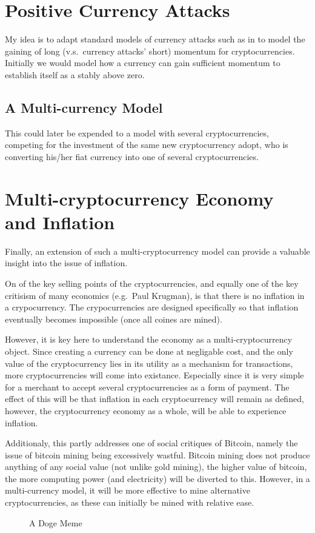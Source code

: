 \begin{refsection}
\section{Positive Currency Attacks}
My idea is to adapt standard models of currency attacks such as in 
\textcite{obstfeld1986rational,obstfeld1995logic,obstfeld1996models}
to model the gaining of long (v.s.~currency attacks' short) momentum for cryptocurrencies.
Initially we would model how a currency can gain sufficient momentum to establish itself as a stably above zero.

\subsection{A Multi-currency Model}
This could later be expended to a model with several cryptocurrencies,
competing for the investment of the same new cryptocurrency adopt,
who is converting his/her fiat currency into one of several cryptocurrencies.

\section{Multi-cryptocurrency Economy and Inflation}
Finally, an extension of such a multi-cryptocurrency model can provide a valuable insight into the issue of inflation.

On of the key selling points of the cryptocurrencies, and equally one of the key critisism of many economics
(e.g.~Paul Krugman), is that there is no inflation in a crypocurrency.
The crypocurrencies are designed specifically so that inflation eventually becomes impossible (once all coines are mined).

However, it is key here to understand the economy as a multi-cryptocurrency object.
Since creating a currency can be done at negligable cost,
and the only value of the cryptocurrency lies in its utility as a mechanism for transactions,
more cryptocurrencies will come into existance.
Especially since it is very simple for a merchant to accept several cryptocurrencies as a form of payment.
The effect of this will be that inflation in each cryptocurrency will remain as defined,
however, the cryptocurrency economy as a whole, will be able to experience inflation.

Additionaly, this partly addresses one of social critiques of Bitcoin,
namely the issue of bitcoin mining being excessively wastful.
Bitcoin mining does not produce anything of any social value (not unlike gold mining),
the higher value of bitcoin, the more computing power (and electricity) will be diverted to this.
However, in a multi-currency model, it will be more effective to mine alternative cryptocurrencies,
as these can initially be mined with relative ease.


\begin{figure}
\caption{A Doge Meme}
\label{doge}
\end{figure}

\printbibliography
\end{refsection}